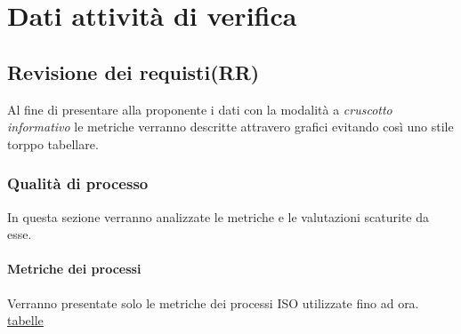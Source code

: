 \section{Dati attività di verifica}
\subsection{Revisione dei requisti(RR)}
Al fine di presentare alla proponente i dati con la modalità a \textit{cruscotto informativo} le metriche verranno descritte attravero grafici evitando così uno stile torppo tabellare.
\subsubsection{Qualità di processo}
In questa sezione verranno analizzate le metriche e le valutazioni scaturite da esse.
\paragraph{Metriche dei processi}
\hspace{15cm}
Verranno presentate solo le metriche dei processi ISO utilizzate fino ad ora.
\href{https://www.tablesgenerator.com/}{tabelle}
